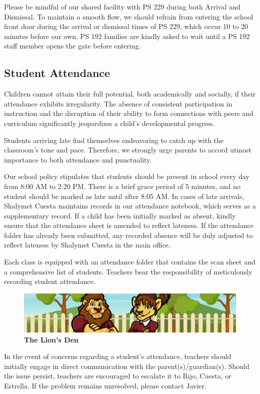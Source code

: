 \documentclass[11pt, letterpaper]{article}
\begin{document}
Please be mindful of our shared facility with PS 229 during both Arrival and Dismissal. To maintain a smooth flow, we should refrain from entering the school front door during the arrival or dismissal times of PS 229, which occur 10 to 20 minutes before our own. PS 192 families are kindly asked to wait until a PS 192 staff member opens the gate before entering.
\subsection{Student Attendance}
Children cannot attain their full potential, both academically and socially, if their attendance exhibits irregularity. The absence of consistent participation in instruction and the disruption of their ability to form connections with peers and curriculum significantly jeopardizes a child's developmental progress.

Students arriving late find themselves endeavoring to catch up with the classroom's tone and pace. Therefore, we strongly urge parents to accord utmost importance to both attendance and punctuality.

Our school policy stipulates that students should be present in school every day from 8:00 AM to 2:20 PM. There is a brief grace period of 5 minutes, and no student should be marked as late until after 8:05 AM. In cases of late arrivals, Shalymet Cuesta maintains records in our attendance notebook, which serves as a supplementary record. If a child has been initially marked as absent, kindly ensure that the attendance sheet is amended to reflect lateness. If the attendance folder has already been submitted, any recorded absence will be duly adjusted to reflect lateness by Shalymet Cuesta in the main office.

Each class is equipped with an attendance folder that contains the scan sheet and a comprehensive list of students. Teachers bear the responsibility of meticulously recording student attendance.
\begin{figure}[h]
  \centering
\includegraphics[width=1\linewidth]{2.png}
\caption{\textbf{The Lion's Den}}
  \label{fig:school mascots}
\end{figure}
In the event of concerns regarding a student's attendance, teachers should initially engage in direct communication with the parent(s)/guardian(s). Should the issue persist, teachers are encouraged to escalate it to Rijo, Cuesta, or Estrella. If the problem remains unresolved, please contact Javier.
\end{document}
